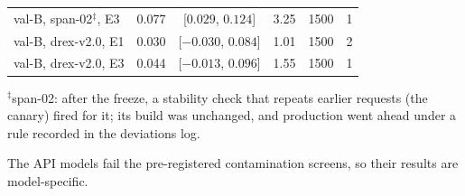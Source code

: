 \begin{table}[htbp]
\begin{threeparttable}
\begin{tabular}{@{}lS[table-format=1.3]cS[table-format=1.2]S[table-format=4.0]S[table-format=1.0]@{}}
val-B, span-02$^{\ddagger}$, E3 & 0.077 & [$0.029$, $0.124$] & 3.25 & 1500 & 1 \\
val-B, drex-v2.0, E1 & 0.030 & [$-0.030$, $0.084$] & 1.01 & 1500 & 2 \\
val-B, drex-v2.0, E3 & 0.044 & [$-0.013$, $0.096$] & 1.55 & 1500 & 1 \\
\bottomrule
\end{tabular}
\begin{tablenotes}[flushleft]\footnotesize
\item $^{\ddagger}$span-02: after the freeze, a stability check that repeats earlier requests (the canary) fired for it; its build was unchanged, and production went ahead under a rule recorded in the deviations log.
\item The API models fail the pre-registered contamination screens, so their results are model-specific.
\end{tablenotes}
\end{threeparttable}
\end{table}
